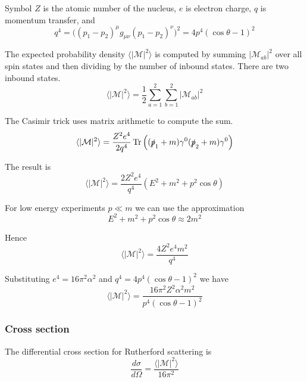 Symbol $Z$ is the atomic number of the nucleus, $e$ is electron charge,
$q$ is momentum transfer, and
\begin{equation*}
q^4=\bigl((p_1-p_2)^\mu g_{\mu\nu}(p_1-p_2)^\nu\bigr)^2=4p^4(\cos\theta-1)^2
\end{equation*}

The expected probability density
$\langle\vert\mathcal{M}\vert^2\rangle$
is computed by summing $|\mathcal{M}_{ab}|^2$
over all spin states and then dividing by the number of inbound states.
There are two inbound states.
\begin{equation*}
\langle\vert\mathcal{M}\vert^2\rangle
=\frac{1}{2}\sum_{a=1}^2\sum_{b=1}^2\left|\mathcal{M}_{ab}\right|^2
\end{equation*}

The Casimir trick uses matrix arithmetic to compute the sum.
\begin{equation*}
\langle\vert\mathcal{M}\vert^2\rangle
=\frac{Z^2e^4}{2q^4}\mathop{\rm Tr}\left((\slashed{p}_1+m)\gamma^0(\slashed{p}_2+m)\gamma^0\right)
\end{equation*}

The result is
\begin{equation*}
\langle\vert\mathcal{M}\vert^2\rangle
=\frac{2Z^2e^4}{q^4}\left(E^2+m^2+p^2\cos\theta\right)
\end{equation*}

For low energy experiments $p\ll m$ we can use the approximation
\begin{equation*}
E^2+m^2+p^2\cos\theta\approx2m^2
\end{equation*}

Hence
\begin{equation*}
\langle|\mathcal{M}|^2\rangle=\frac{4Z^2e^4m^2}{q^4}
\end{equation*}

Substituting $e^4=16\pi^2\alpha^2$ and $q^4=4p^4(\cos\theta-1)^2$ we have
\begin{equation*}
\langle|\mathcal{M}|^2\rangle=\frac{16\pi^2Z^2\alpha^2m^2}{p^4(\cos\theta-1)^2}
\end{equation*}

\subsubsection*{Cross section}
The differential cross section for Rutherford scattering is
\begin{equation*}
\frac{d\sigma}{d\Omega}=\frac{\langle|\mathcal{M}|^2\rangle}{16\pi^2}
\end{equation*}

